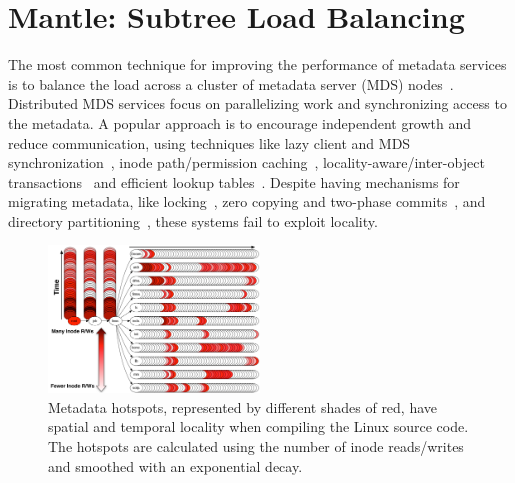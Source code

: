 \chapter{Mantle: Subtree Load Balancing}
\label{mantle}

The most common technique for improving the performance of metadata services is
to balance the load across a cluster of metadata server (MDS)
nodes~\cite{patil:fast2011-giga+, weil:osdi2006-ceph, weil:sc2004-dyn-metadata,
sinnamohideen:atc2010-ursa, xing:sc2009-skyfs}.  Distributed MDS services focus
on parallelizing work and synchronizing access to the metadata. A popular
approach is to encourage independent growth and reduce communication, using
techniques like lazy client and MDS synchronization~\cite{patil:fast2011-giga+,
ren:sc2014-indexfs, zheng:pdsw2014-batchfs, hildebrand:msst2005-pnfs,
zhu:pds2008-hba}, inode path/permission caching~\cite{brandt:mss2003-lh,
li:msst2006-dynamic, xing:sc2009-skyfs}, locality-aware/inter-object
transactions~\cite{sinnamohideen:atc2010-ursa,zhu:pds2008-hba,ren:atc2013-tablefs,
ren:sc2014-indexfs} and efficient lookup tables~\cite{brandt:mss2003-lh,
zhu:pds2008-hba}. Despite having mechanisms for migrating metadata, like
locking~\cite{sinnamohideen:atc2010-ursa,schmuck:fast2002-gpfs}, zero copying
and two-phase commits~\cite{sinnamohideen:atc2010-ursa}, and directory
partitioning~\cite{xing:sc2009-skyfs, patil:fast2011-giga+, ren:sc2014-indexfs,
weil:osdi2006-ceph}, these systems fail to exploit locality.

\begin{figure}[tb]
	\centering	
	\includegraphics[width=0.5\textwidth]{./chapters/mantle/figures/workload-tar.png}
	\caption{Metadata hotspots, represented by different shades of red, have spatial and temporal locality when compiling the Linux source code. The hotspots are calculated using the number of inode reads/writes and smoothed with an exponential decay. \label{figure:workload-tar}}
\end{figure}

